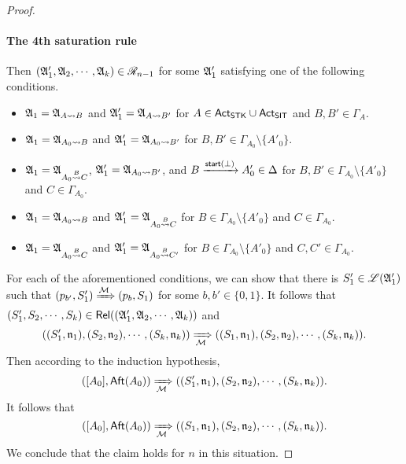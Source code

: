 \begin{proof}
\paragraph*{The 4th saturation rule} Then $({\mathfrak{A} }'_1, {\mathfrak{A} }_2, \cdots, {\mathfrak{A} }_k) \in \mathscr{R}_{n-1}$ for some ${\mathfrak{A} }'_1$ satisfying one of the following conditions. 
\begin{itemize}
\item ${\mathfrak{A} }_1 = {\mathfrak{A} }_{A \rightsquigarrow B}$ and ${\mathfrak{A} }'_1 = {\mathfrak{A} }_{A \rightsquigarrow B'}$ for $A \in {\sf Act}_{\sf STK} \cup {\sf Act}_{\sf SIT}$ and $B, B' \in \Gamma_A$. 
%
\item ${\mathfrak{A} }_1 = {\mathfrak{A} }_{A_0 \rightsquigarrow B}$ and ${\mathfrak{A} }'_1 = {\mathfrak{A} }_{A_0 \rightsquigarrow B'}$ for $B, B' \in \Gamma_{A_0} \setminus \{A'_0\}$.  
%
\item ${\mathfrak{A} }_1 = {\mathfrak{A} }_{A_0 \stackrel{B}{\rightsquigarrow} C}$, ${\mathfrak{A} }'_1 = {\mathfrak{A} }_{A_0 \rightsquigarrow B'}$, and $B \xrightarrow{{\mathsf{start} }(\bot)} A'_0 \in \Delta$ for $B, B' \in \Gamma_{A_0} \setminus \{A'_0\}$ and $C \in \Gamma_{A_0}$. 
%
\item ${\mathfrak{A} }_1 = {\mathfrak{A} }_{A_0 \rightsquigarrow B}$ and ${\mathfrak{A} }'_1 = {\mathfrak{A} }_{A_0 \stackrel{B}{\rightsquigarrow} C}$ for $B \in \Gamma_{A_0} \setminus \{A'_0\}$ and $C \in \Gamma_{A_0}$. 
%
\item ${\mathfrak{A} }_1 = {\mathfrak{A} }_{A_0 \stackrel{B}{\rightsquigarrow} C}$ and ${\mathfrak{A} }'_1 = {\mathfrak{A} }_{A_0 \stackrel{B}{\rightsquigarrow} C'}$ for $B \in \Gamma_{A_0} \setminus \{A'_0\}$ and $C, C' \in \Gamma_{A_0}$.
\end{itemize}

For each of the aforementioned conditions, 
we can show that there is $S'_1 \in {\mathscr{L} }({\mathfrak{A} }'_1)$ such that $(p_{b'}, S'_1) \xRightarrow{{\mathcal{M} }} (p_b, S_1)$ for some $b, b' \in \{0, 1\}$.  
It follows that $(S'_1, S_2, \cdots, S_k) \in \mathsf{Rel}(({\mathfrak{A} }'_1, {\mathfrak{A} }_2, \cdots, {\mathfrak{A} }_k))$ and
 \[((S'_1, \mathfrak{n}_1), (S_2, \mathfrak{n}_2), \cdots, (S_k, \mathfrak{n}_k)) \xRightarrow[{\mathcal{M} }]{} ((S_1, \mathfrak{n}_1), (S_2, \mathfrak{n}_2), \cdots, (S_k, \mathfrak{n}_k)). \]
Then according to the induction hypothesis, 
 \[([A_0], {\sf Aft}(A_0)) \xRightarrow[{\mathcal{M} }]{} ((S'_1, \mathfrak{n}_1), (S_2, \mathfrak{n}_2), \cdots, (S_k, \mathfrak{n}_k)). \]
It follows that  
 \[([A_0], {\sf Aft}(A_0)) \xRightarrow[{\mathcal{M} }]{} ((S_1, \mathfrak{n}_1), (S_2, \mathfrak{n}_2), \cdots, (S_k, \mathfrak{n}_k)). \]
We conclude that the claim holds for $n$ in this situation.  


\end{proof}
